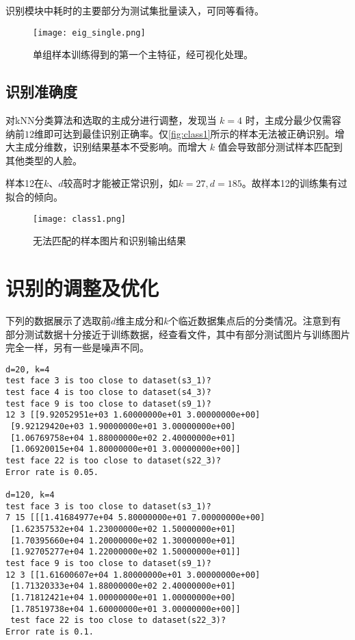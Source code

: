 识别模块中耗时的主要部分为测试集批量读入，可同等看待。

\begin{figure}[h]
    \centering
    \texttt{[image: eig\_single.png]}
    \caption{单组样本训练得到的第一个主特征，经可视化处理。}
    \label{fig:eig_single}
\end{figure}

\subsection{识别准确度}

对kNN分类算法和选取的主成分进行调整，发现当 $k=4$ 时，主成分最少仅需容纳前$12$维即可达到最佳识别正确率。仅\autoref{fig:class1}所示的样本无法被正确识别。增大主成分维数，识别结果基本不受影响。而增大 $k$ 值会导致部分测试样本匹配到其他类型的人脸。

样本12在$k$、$d$较高时才能被正常识别，如$k=27, d=185$。故样本12的训练集有过拟合的倾向。

\begin{figure}[H]
    \centering
    \texttt{[image: class1.png]}
    \caption{无法匹配的样本图片和识别输出结果}
    \label{fig:class1}
\end{figure}

\section{识别的调整及优化}

下列的数据展示了选取前$d$维主成分和$k$个临近数据集点后的分类情况。注意到有部分测试数据十分接近于训练数据，经查看文件，其中有部分测试图片与训练图片完全一样，另有一些是噪声不同。

\begin{verbatim}
d=20, k=4
test face 3 is too close to dataset(s3_1)?
test face 4 is too close to dataset(s4_3)?
test face 9 is too close to dataset(s9_1)?
12 3 [[9.92052951e+03 1.60000000e+01 3.00000000e+00]
 [9.92129420e+03 1.90000000e+01 3.00000000e+00]
 [1.06769758e+04 1.88000000e+02 2.40000000e+01]
 [1.06920015e+04 1.80000000e+01 3.00000000e+00]]
test face 22 is too close to dataset(s22_3)?
Error rate is 0.05.

d=120, k=4
test face 3 is too close to dataset(s3_1)?
7 15 [[[1.41684977e+04 5.80000000e+01 7.00000000e+00]
 [1.62357532e+04 1.23000000e+02 1.50000000e+01]
 [1.70395660e+04 1.20000000e+02 1.30000000e+01]
 [1.92705277e+04 1.22000000e+02 1.50000000e+01]]
test face 9 is too close to dataset(s9_1)?
12 3 [[1.61600607e+04 1.80000000e+01 3.00000000e+00]
 [1.71320333e+04 1.88000000e+02 2.40000000e+01]
 [1.71812421e+04 1.00000000e+01 1.00000000e+00]
 [1.78519738e+04 1.60000000e+01 3.00000000e+00]]
 test face 22 is too close to dataset(s22_3)?
Error rate is 0.1.
\end{verbatim}

